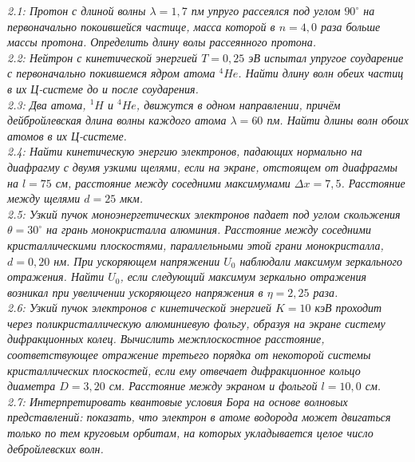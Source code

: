     \emph{2.1: Протон с длиной волны \( \lambda = 1,7 \) пм упруго
    	рассеялся под углом \( 90^{\circ} \) на первоначально покоившейся 
    	частице, масса которой в \( n = 4,0 \) раза больше массы протона. 
    	Определить длину волы рассеянного протона.} \\

    \emph{2.2: Нейтрон с кинетической энергией \( T = 0,25 \) эВ 
        испытал упругое соударение с первоначально покившемся ядром атома 
        \( ^4He \). Найти длину волн обеих частиц в их Ц-системе до и 
        после соударения.}\\

    \emph{2.3: Два атома, \( ^1H \) и \( ^4He \), движутся в одном 
        направлении, причём дейбройлевская длина волны каждого атома 
        \( \lambda = 60 \) пм. Найти длины волн обоих атомов в их 
        Ц-системе.}\\

    \emph{2.4: Найти кинетическую энергию электронов, падающих нормально 
        на диафрагму с двумя узкими щелями, если на экране, отстоящем от 
        диафрагмы на \( l = 75 \) см, расстояние между соседними 
        максимумами \( \Delta x = 7,5 \). Расстояние между щелями 
        \( d = 25 \) мкм.}\\

	\emph{2.5: Узкий пучок моноэнергетических электронов падает под углом
		скольжения \( \theta = 30^\circ \) на грань монокристалла алюминия. 
		Расстояние между соседними кристаллическими плоскостями, 
		параллельными этой грани монокристалла, \( d = 0,20 \) нм. 
		При ускоряющем напряжении \( U_0 \) наблюдали
		максимум зеркального отражения. Найти \( U_0 \), если следующий 
		максимум зеркально отражения возникал при увеличении ускоряющего 
		напряжения в \( \eta = 2,25 \) раза.} \\

	\emph{2.6: Узкий пучок электронов с кинетической энергией \( K = 10 \) 
		кэВ проходит через поликристаллическую алюминиевую фольгу, 
		образуя на экране систему дифракционных колец. 
		Вычислить межплоскостное расстояние, соответствующее отражение 
		третьего порядка от некоторой системы кристаллических плоскостей, 
		если ему отвечает дифракционное кольцо диаметра \( D = 3,20 \) см. 
		Расстояние между экраном и фольгой \( l = 10,0 \) см.}\\

	\emph{2.7: Интерпретировать квантовые условия Бора на основе волновых
		представлений: показать, что электрон в атоме водорода может 
		двигаться только по тем круговым орбитам, на которых укладывается 
		целое число дебройлевских волн.}\\

